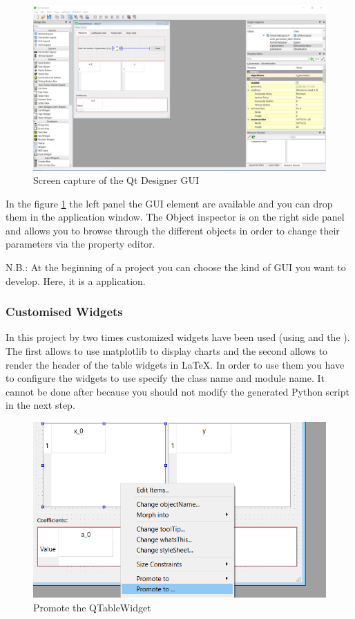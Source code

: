 \documentclass[english, 12 pt, openany, oneside]{book}
\begin{document}
\begin{figure}[!ht]
\centering
\includegraphics[width=\linewidth]{full_GUI}
\caption{Screen capture of the Qt Designer GUI\label{full_qt}}
\end{figure}

In the figure \ref{full_qt} the left panel the GUI element are available and you can drop them in the application window. The Object inspector is on the right side panel and allows you to browse through the different objects in order to change their parameters via the property editor.

N.B.: At the beginning of a project you can choose the kind of GUI you want to develop. Here, it is a  application.

\clearpage
\subsubsection{Customised Widgets}
In this project by two times customized widgets have been used (using  and the ). The first allows to use matplotlib to display charts and the second allows to render the header of the table widgets in LaTeX. In order to use them you have to configure the widgets to use specify the class name and module name. It cannot be done after because you should not modify the generated Python script in the next step.

\begin{figure}[!ht]
\centering
\includegraphics[width=0.8\linewidth]{promote_widget}
\caption{Promote the QTableWidget\label{fig:promote_widget}}
\end{figure}
\end{document}
